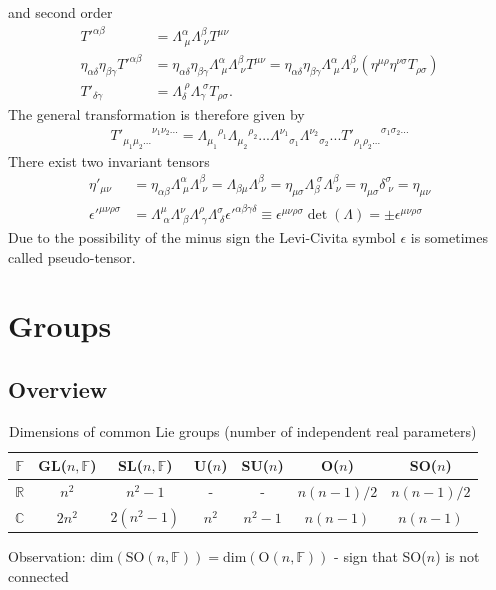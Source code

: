 \documentclass[10pt,a4paper]{article}
\theoremstyle{definition}
\begin{document}
and second order
\begin{align}
    T'^{\alpha\beta}&=\Lambda^\alpha_{\;\mu}\Lambda^\beta_{\;\nu}T^{\mu\nu}\\
    \eta_{\alpha\delta}\eta_{\beta\gamma}T'^{\alpha\beta}&=\eta_{\alpha\delta}\eta_{\beta\gamma}\Lambda^\alpha_{\;\mu}\Lambda^\beta_{\;\nu}T^{\mu\nu}=\eta_{\alpha\delta}\eta_{\beta\gamma}\Lambda^\alpha_{\;\mu}\Lambda^\beta_{\;\nu}(\eta^{\mu\rho}\eta^{\nu\sigma} T_{\rho\sigma})\\
    T'_{\delta\gamma}&=\Lambda_\delta^{\;\rho}\Lambda_\gamma^{\;\sigma}T_{\rho\sigma}.
\end{align}
The general transformation is therefore given by
\begin{align}
    {T'_{\mu_1\mu_2...}}^{\nu_1\nu_2...}={\Lambda_{\mu_1}}^{\rho_1}{\Lambda_{\mu_2}}^{\rho_2}... {\Lambda^{\nu_1}}_{\sigma_1}{\Lambda^{\nu_2}}_{\sigma_2}... {T'_{\rho_1\rho_2...}}^{\sigma_1\sigma_2...}
\end{align}
There exist two invariant tensors
\begin{align}
    \eta'_{\mu\nu} 
    &=\eta_{\alpha\beta}\Lambda^\alpha_{\;\mu} \Lambda^\beta_{\;\nu}
    =\Lambda_{\beta\mu} \Lambda^\beta_{\;\nu}
    =\eta_{\mu\sigma}\Lambda_{\beta}^{\;\sigma} \Lambda^\beta_{\;\nu}
    =\eta_{\mu\sigma}\delta^\sigma_{\;\nu}
    =\eta_{\mu\nu}\\
    {\epsilon'}^{\mu\nu\rho\sigma}
    &=\Lambda^\mu_{\;\alpha}\Lambda^\nu_{\;\beta}\Lambda^\rho_{\;\gamma}\Lambda^\sigma_{\;\delta}{\epsilon'}^{\alpha\beta\gamma\delta}\equiv \epsilon^{\mu\nu\rho\sigma} \det(\Lambda)=\pm \epsilon^{\mu\nu\rho\sigma}
\end{align}
Due to the possibility of the minus sign the Levi-Civita symbol $\epsilon$ is sometimes called pseudo-tensor.

\section{Groups}
\subsection{Overview}
\begin{table}[!h]
    \centering
    \begin{tabular}{c | c c c c c c}
        $\mathbb{F}$    & GL($n,\mathbb{F}$)    & SL($n,\mathbb{F}$) & U($n$) & SU($n$) & O($n$)     & SO($n$)     \\ \hline\hline
        $\mathbb{R}$    & $n^2$                 & $n^2-1$            & -      & -       & $n(n-1)/2$ & $n(n-1)/2$  \\
        $\mathbb{C}$    & $2n^2$                & $2(n^2-1)$         & $n^2$  & $n^2-1$ & $n(n-1)$   & $n(n-1)$    \\
    \end{tabular}
    \caption{Dimensions of common Lie groups (number of independent real parameters)}
    \label{tab:my_label}
\end{table}
Observation: $\text{dim}(\text{SO}(n,\mathbb{F}))=\text{dim}(\text{O}(n,\mathbb{F}))$  - sign that SO($n$) is not connected
\end{document}
